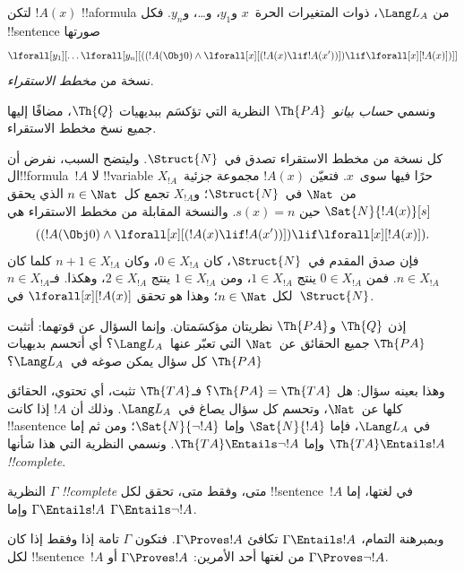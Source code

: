 \documentclass[../../../include/open-logic-section]{subfiles}
\begin{document}
\begin{defn}
لتكن $!A(x)$ !!a{formula} من $\Lang L_A$، ذوات المتغيرات
الحرة~$x$ و$y_1$، و\dots، و$y_n$. فكل !!{sentence} صورتها
\[
\lforall[y_1][\dots\lforall[y_n][((!A(\Obj 0) \land \lforall[x][(!A(x)
\lif !A(x'))]) \lif \lforall[x][!A(x)])]]
\]
نسخة من \emph{مخطط الاستقراء}.

ونسمي \emph{حساب بيانو}~$\Th{PA}$ النظرية التي تؤكسَم
ببديهيات $\Th{Q}$، مضافًا إليها جميع نسخ مخطط الاستقراء.
\end{defn}

\begin{explain}
كل نسخة من مخطط الاستقراء تصدق في~$\Struct{N}$.
وليتضح السبب، نفرض أن ال!!{formula}~$!A$ لا
!!{variable} حرًا فيها سوى~$x$. فتعيّن $!A(x)$ مجموعة
جزئية~$X_{!A}$ من~$\Nat$ في~$\Struct{N}$؛
و$X_{!A}$ تجمع كل~$n\in\Nat$ الذي يحقق
$\Sat{N}{!A(x)}[s]$ حين $s(x)=n$. والنسخة المقابلة
من مخطط الاستقراء هي
\[
((!A(\Obj 0) \land \lforall[x][(!A(x) \lif !A(x'))]) \lif
  \lforall[x][!A(x)]).
\]
فإن صدق المقدم في~$\Struct{N}$، كان $0\in X_{!A}$،
وكان $n+1\in X_{!A}$ كلما كان $n\in X_{!A}$.
فمن $0\in X_{!A}$ ينتج $1\in X_{!A}$، ومن
$1\in X_{!A}$ ينتج $2\in X_{!A}$، وهكذا.
فـ$n\in X_{!A}$ لكل $n\in\Nat$؛ وهذا هو تحقق
$\lforall[x][!A(x)]$ في~$\Struct{N}$.
\end{explain}

إذن $\Th{Q}$ و$\Th{PA}$ نظريتان مؤكسَمتان.
وإنما السؤال عن قوتهما: أتثبت $\Th{PA}$ جميع
الحقائق عن~$\Nat$ التي تعبّر عنها~$\Lang L_A$؟
أي أتحسم بديهيات $\Th{PA}$ كل سؤال يمكن صوغه
في~$\Lang L_A$؟

وهذا بعينه سؤال: هل $\Th{PA}=\Th{TA}$؟
فـ$\Th{TA}$ تثبت، أي تحتوي، الحقائق كلها عن~$\Nat$،
وتحسم كل سؤال يصاغ في~$\Lang L_A$. وذلك أن $!A$
إذا كانت !!a{sentence} في $\Lang L_A$، فإما
$\Sat{N}{!A}$ وإما $\Sat{N}{\lnot !A}$؛ ومن ثم
إما $\Th{TA}\Entails !A$ وإما $\Th{TA}\Entails\lnot !A$.
ونسمي النظرية التي هذا شأنها \emph{!!{complete}}.

\begin{defn}
النظرية $\Gamma$ \emph{!!{complete}} متى، وفقط متى، تحقق لكل
!!{sentence}~$!A$ في لغتها، إما $\Gamma\Entails !A$ وإما
$\Gamma\Entails\lnot !A$.
\end{defn}

\begin{explain}
وبمبرهنة التمام، $\Gamma\Entails !A$ تكافئ
$\Gamma\Proves !A$. فتكون $\Gamma$ تامة إذا وفقط إذا
كان لكل !!{sentence}~$!A$ من لغتها أحد الأمرين:
$\Gamma\Proves !A$ أو $\Gamma\Proves\lnot !A$.
\end{explain}
\end{document}
